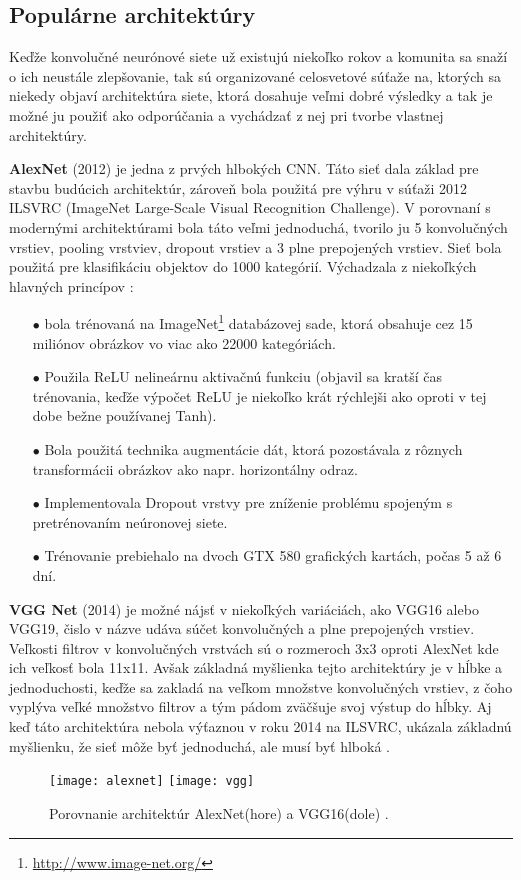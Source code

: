 \subsection{Populárne architektúry}
\label{subsec:popularCNN}
Keďže konvolučné neurónové siete už existujú niekoľko rokov a komunita sa snaží o ich neustále zlepšovanie, tak sú organizované
    celosvetové súťaže na, ktorých sa niekedy objaví architektúra siete, ktorá dosahuje veľmi dobré výsledky a tak je možné ju použiť ako odporúčania a
    vychádzať z nej pri tvorbe vlastnej architektúry.

\textbf{AlexNet} (2012) je jedna z prvých hlbokých CNN. Táto sieť dala základ pre stavbu budúcich architektúr, zároveň bola použitá
    pre výhru v súťaži 2012 ILSVRC (ImageNet Large-Scale Visual Recognition Challenge).
V porovnaní s modernými architektúrami bola táto veľmi jednoduchá, tvorilo ju 5 konvolučných vrstiev, pooling vrstviev, dropout vrstiev a 3 plne prepojených vrstiev.
Sieť bola použitá pre klasifikáciu objektov do 1000 kategórií.
Výchadzala z niekoľkých hlavných princípov \cite{odkaz:PopularCNN}:
\begin{enumerate}
    \item[$\bullet$] bola trénovaná na ImageNet\footnote{\url{http://www.image-net.org/}} databázovej sade, ktorá obsahuje cez 15 miliónov obrázkov vo viac ako 22000 kategóriách.
    \item[$\bullet$] Použila ReLU nelineárnu aktivačnú funkciu (objavil sa kratší čas trénovania, keďže výpočet ReLU je niekoľko krát rýchlejši ako oproti v tej dobe bežne používanej Tanh).
    \item[$\bullet$] Bola použitá technika augmentácie dát, ktorá pozostávala z rôznych transformácii obrázkov ako napr. horizontálny odraz.
    \item[$\bullet$] Implementovala Dropout vrstvy pre zníženie problému spojeným s pretrénovaním neúronovej siete.
    \item[$\bullet$] Trénovanie prebiehalo na dvoch GTX 580 grafických kartách, počas 5 až 6 dní.
\end{enumerate}

\textbf{VGG Net} (2014) je možné nájsť v niekoľkých variáciách, ako VGG16 alebo VGG19, čislo v názve udáva súčet konvolučných a plne prepojených vrstiev.
Veľkosti filtrov v konvolučných vrstvách sú o rozmeroch 3x3 oproti AlexNet kde ich veľkosť bola 11x11.
Avšak základná myšlienka tejto architektúry je v hĺbke a jednoduchosti, keďže sa zakladá na veľkom množstve konvolučných vrstiev, z čoho vyplýva
    veľké množstvo filtrov a tým pádom zväčšuje svoj výstup do hĺbky.
Aj keď táto architektúra nebola výťaznou v roku 2014 na ILSVRC, ukázala základnú myšlienku, že sieť môže byť jednoduchá, ale musí byť hlboká \cite{odkaz:PopularCNN}.

\begin{figure}[H]
    \centering
    \texttt{[image: alexnet]}
    \qquad
    \texttt{[image: vgg]}
    \caption{Porovnanie architektúr AlexNet(hore) \cite{odkaz:AlexNet} a VGG16(dole) \cite{odkaz:VGG16}.}
    \label{pic:PopularCNN}
\end{figure}
